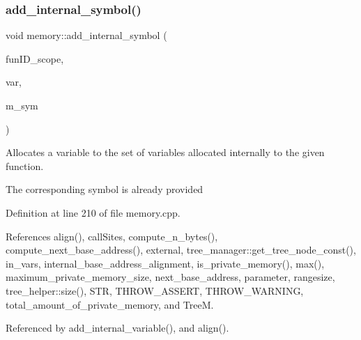 \subsubsection{\texorpdfstring{add\+\_\+internal\+\_\+symbol()}{add\_internal\_symbol()}}
{\footnotesize\ttfamily void memory\+::add\+\_\+internal\+\_\+symbol (\begin{DoxyParamCaption}\item[{unsigned int}]{fun\+I\+D\+\_\+scope,  }\item[{unsigned int}]{var,  }\item[{const \hyperlink{memory__symbol_8hpp_af3608dbc27177447c2d777fa712cc82a}{memory\+\_\+symbol\+Ref}}]{m\+\_\+sym }\end{DoxyParamCaption})}



Allocates a variable to the set of variables allocated internally to the given function. 

The corresponding symbol is already provided 

Definition at line 210 of file memory.\+cpp.



References align(), call\+Sites, compute\+\_\+n\+\_\+bytes(), compute\+\_\+next\+\_\+base\+\_\+address(), external, tree\+\_\+manager\+::get\+\_\+tree\+\_\+node\+\_\+const(), in\+\_\+vars, internal\+\_\+base\+\_\+address\+\_\+alignment, is\+\_\+private\+\_\+memory(), max(), maximum\+\_\+private\+\_\+memory\+\_\+size, next\+\_\+base\+\_\+address, parameter, rangesize, tree\+\_\+helper\+::size(), S\+TR, T\+H\+R\+O\+W\+\_\+\+A\+S\+S\+E\+RT, T\+H\+R\+O\+W\+\_\+\+W\+A\+R\+N\+I\+NG, total\+\_\+amount\+\_\+of\+\_\+private\+\_\+memory, and TreeM.



Referenced by add\+\_\+internal\+\_\+variable(), and align().

